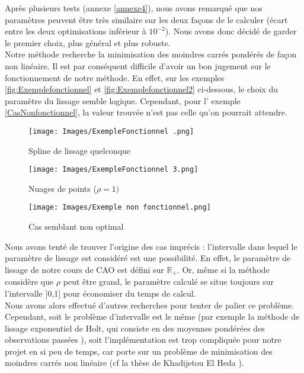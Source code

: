 \documentclass[a4paper,12pt]{article} %
\begin{document}
                Après plusieurs tests (annexe \ref{annexe4}), nous avons remarqué que nos paramètres peuvent être très   similaire sur les deux façons de le calculer (écart entre les deux optimisations inférieur à $10^{-2}$). Nous avons donc décidé de garder le premier choix, plus général et plus robuste.\\
                
                Notre méthode recherche la minimisation des moindres carrés pondérés de façon non linéaire. Il est par conséquent difficile d'avoir un bon jugement sur le fonctionnement de notre méthode. En effet, sur les exemples \ref{fig:Exemplefonctionnel} et \ref{fig:Exemplefonctionnel2}  ci-dessous, le choix du paramètre du lissage semble logique. Cependant, pour l' exemple \ref{CasNonfonctionnel}, la valeur trouvée n'est pas celle qu'on pourrait attendre.

                
                \begin{figure}[H]
                    \texttt{[image: Images/ExempleFonctionnel .png]}
                     \caption{Spline de lissage quelconque}\label{fig:Exemplefonctionnel}
                \endminipage\hfill
                    \texttt{[image: Images/ExempleFonctionnel 3.png]}
                     \caption{Nuages de points ($\rho = 1)$ }\label{fig:Exemplefonctionnel2}
                \endminipage\hfill
                    \texttt{[image: Images/Exemple non fonctionnel.png]}
                    \caption{Cas semblant non optimal}\label{fig:ExempleNonfonctionnel1}
                \endminipage
                \end{figure}

    
                Nous avons tenté de trouver l'origine des cas imprécis : l'intervalle dans lequel le paramètre de lissage est considéré est une possibilité. En effet, le paramètre de lissage de notre cours de CAO est défini sur $\mathds{R}_{+}$. Or, même si la méthode considère que $\rho$ peut être grand, le paramètre calculé se situe toujours sur l'intervalle ]0,1] pour économiser du temps de calcul.\\
                
                Nous avons alors effectué d'autres recherches pour tenter de palier ce problème. Cependant, soit le problème d'intervalle est le même (par exemple la méthode de lissage exponentiel de Holt, qui consiste en des moyennes pondérées des observations passées \cite{Param_lissage}), soit l'implémentation est trop compliquée pour notre projet en si peu de temps, car porte sur un problème de minimisation des moindres carrés non linéaire (cf la thèse de Khadijetou El Heda \cite{Exemple_these}). 
\end{document}
